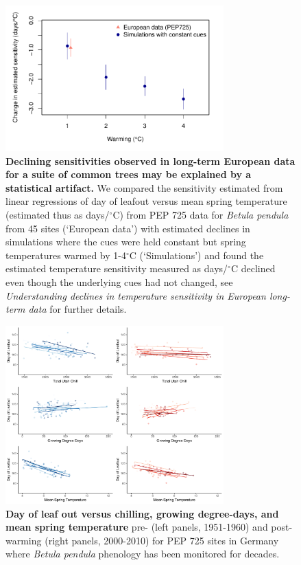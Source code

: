 \documentclass{article}
\begin{document}
\newpage
\begin{figure}[h!]
\centering
\noindent \includegraphics[width=0.75\textwidth]{..//..//analyses/bb_analysis/PEP_climate/figures/peprealandsims.pdf}
\caption{\textbf{Declining sensitivities observed in long-term European data for a suite of common trees may be explained by a statistical artifact.} We compared the sensitivity estimated from linear regressions of day of leafout versus mean spring temperature (estimated thus as days/$^{\circ}$C) from PEP 725 data for \emph{Betula pendula} from 45 sites (`European data') with estimated declines in simulations where the cues were held constant but spring temperatures warmed by 1-4$^{\circ}$C (`Simulations') and found the estimated temperature sensitivity measured as days/$^{\circ}$C declined even though the underlying cues had not changed, see \emph{Understanding declines in temperature sensitivity in European long-term data} for further details.}
\label{fig:pepsims}
\end{figure}

\newpage
\begin{figure}[h!]
\centering
\noindent \includegraphics[width=0.75\textwidth]{..//..//analyses/bb_analysis/PEP_climate/figures/betpen_multruns_utahgddmat.pdf}
\caption{\textbf{Day of leaf out versus chilling, growing degree-days, and mean spring temperature} pre- (left panels, 1951-1960) and post- warming (right panels, 2000-2010) for PEP 725 sites in Germany where \emph{Betula pendula} phenology has been monitored for decades.}
\label{fig:pep}
\end{figure}
\end{document}
